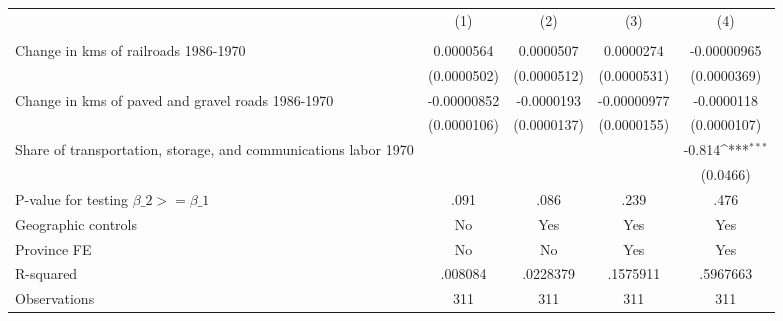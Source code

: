 {
\def\sym#1{\ifmmode^{#1}\else\(^{#1}\)\fi}
\begin{tabular}{l*{4}{c}}
\hline\hline
                &\multicolumn{1}{c}{(1)}&\multicolumn{1}{c}{(2)}&\multicolumn{1}{c}{(3)}&\multicolumn{1}{c}{(4)}\\
                &\multicolumn{1}{c}{}&\multicolumn{1}{c}{}&\multicolumn{1}{c}{}&\multicolumn{1}{c}{}\\
\hline
Change in kms of railroads 1986-1970&0.0000564         &0.0000507         &0.0000274         &-0.00000965         \\
                &(0.0000502)         &(0.0000512)         &(0.0000531)         &(0.0000369)         \\
[1em]
Change in kms of paved and gravel roads 1986-1970&-0.00000852         &-0.0000193         &-0.00000977         &-0.0000118         \\
                &(0.0000106)         &(0.0000137)         &(0.0000155)         &(0.0000107)         \\
[1em]
Share of transportation, storage, and communications labor 1970&                  &                  &                  &   -0.814\sym{***}\\
                &                  &                  &                  & (0.0466)         \\
\hline
P-value for testing $\beta\_{2} >= \beta\_{1}$&     .091         &     .086         &     .239         &     .476         \\
Geographic controls&       No         &      Yes         &      Yes         &      Yes         \\
Province FE     &       No         &       No         &      Yes         &      Yes         \\
R-squared       &  .008084         & .0228379         & .1575911         & .5967663         \\
Observations    &      311         &      311         &      311         &      311         \\
\hline\hline
\end{tabular}
}
